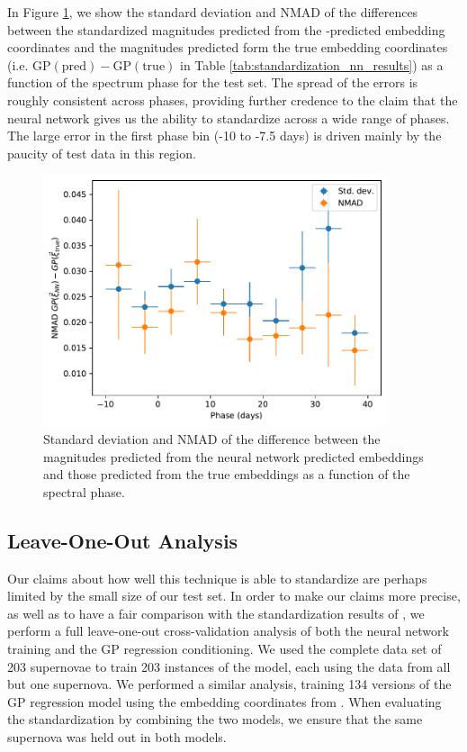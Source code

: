In Figure \ref{fig:stand_err_vs_phase}, we show the standard deviation and NMAD of the differences between the standardized magnitudes predicted from the  \stoe-predicted embedding coordinates and the magnitudes predicted form the true embedding coordinates (i.e. $\textrm{GP}(\textrm{pred}) - \textrm{GP}(\textrm{true})$ in Table \ref{tab:standardization_nn_results}) as a function of the spectrum phase for the test set. The spread of the errors is roughly consistent across phases, providing further credence to the claim that the neural network gives us the ability to standardize across a wide range of phases. The large error in the first phase bin (-10 to -7.5 days) is driven mainly by the paucity of test data in this region.

\begin{figure}[htbp]
    \centering
    \includegraphics[width=0.9\textwidth]{figures/nn_twins/stand_err_vs_phase_nn.pdf}
    \caption{Standard deviation and NMAD of the difference between the magnitudes predicted from the neural network predicted embeddings and those predicted from the true embeddings as a function of the spectral phase.}
    \label{fig:stand_err_vs_phase}
\end{figure}

\subsection{Leave-One-Out Analysis}
Our claims about how well this technique is able to standardize \sne{} are perhaps limited by the small size of our test set. In order to make our claims more precise, as well as to have a fair comparison with the standardization results of , we perform a full leave-one-out cross-validation analysis of both the neural network training and the GP regression conditioning. We used the complete data set of 203 supernovae to train 203 instances of the \stoe{} model, each using the data from all but one supernova. We performed a similar analysis, training 134 versions of the GP regression model using the embedding coordinates from . When evaluating the standardization by combining the two models, we ensure that the same supernova was held out in both models.

